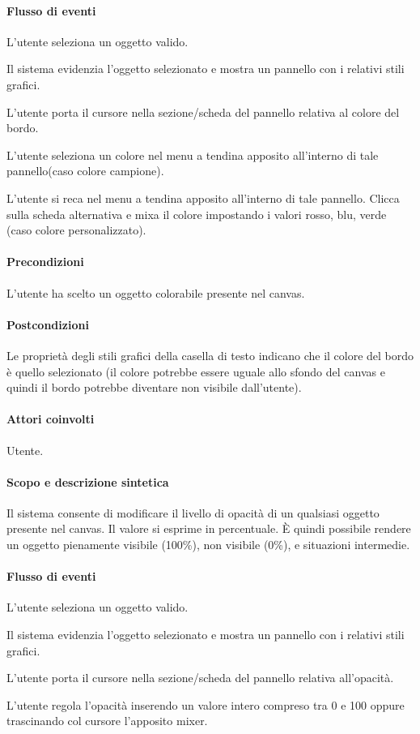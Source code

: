 \paragraph{Flusso di eventi}
\begin{elenconumerato}[\textbf{}]{\subsubsecindent}
\item L'utente seleziona un oggetto valido.
\item Il sistema evidenzia l'oggetto selezionato e mostra un pannello con i relativi stili grafici.
\item L'utente  porta  il cursore nella sezione/scheda del pannello relativa al colore del bordo.
\item L'utente seleziona un colore  nel menu a tendina apposito all'interno di tale pannello(caso colore campione).
\item L'utente si reca nel menu a tendina apposito all'interno di tale pannello. Clicca sulla scheda alternativa e mixa il colore impostando i valori rosso, blu, verde (caso colore personalizzato).
\end{elenconumerato}
\paragraph{Precondizioni} L'utente ha scelto un oggetto colorabile presente nel canvas.
\paragraph{Postcondizioni} Le propriet\` a degli stili grafici della casella di testo indicano che il colore del bordo \`e quello selezionato (il colore potrebbe essere uguale allo sfondo del canvas e quindi il bordo potrebbe diventare non visibile dall'utente).


\paragraph{Attori coinvolti} Utente.
\paragraph{Scopo e descrizione sintetica}  Il sistema consente di modificare il livello di opacit\` a di un qualsiasi oggetto presente nel canvas. Il valore si esprime in percentuale.   \` E quindi possibile rendere un oggetto pienamente visibile (100\%), non visibile (0\%), e situazioni intermedie.
\paragraph{Flusso di eventi}
\begin{elenconumerato}[\textbf{}]{\subsubsecindent}
\item L'utente seleziona un oggetto valido.
\item Il sistema evidenzia l'oggetto selezionato e mostra un pannello con i relativi stili grafici.
\item L'utente porta  il cursore nella sezione/scheda del pannello relativa all'opacit\` a.
\item L'utente regola l'opacit\` a inserendo un valore intero compreso tra 0 e 100 oppure trascinando col cursore l'apposito mixer.
\end{elenconumerato}
